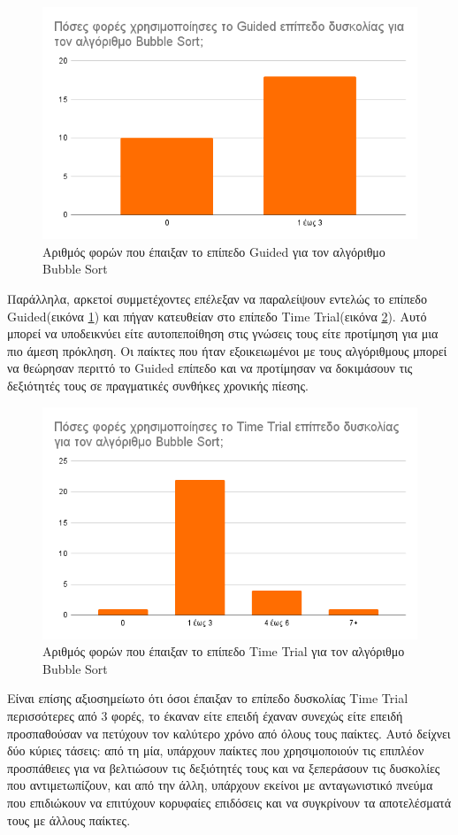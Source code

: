 \begin{figure}[H]
    \centering
    \includegraphics[width=0.7\linewidth]{sections/5/2/images/bubblesort_guided_usages}
    \caption{Αριθμός φορών που έπαιξαν το επίπεδο Guided για τον αλγόριθμο Bubble Sort}
    \label{fig:bubblesort_guided_usages}
\end{figure}

Παράλληλα, αρκετοί συμμετέχοντες επέλεξαν να παραλείψουν εντελώς το επίπεδο Guided(εικόνα \ref{fig:bubblesort_guided_usages}) και πήγαν κατευθείαν στο επίπεδο Time Trial(εικόνα \ref{fig:bubblesort_timetrial_usages}). Αυτό μπορεί να υποδεικνύει είτε αυτοπεποίθηση στις γνώσεις τους είτε προτίμηση για μια πιο άμεση πρόκληση. Οι παίκτες που ήταν εξοικειωμένοι με τους αλγόριθμους μπορεί να θεώρησαν περιττό το Guided επίπεδο και να προτίμησαν να δοκιμάσουν τις δεξιότητές τους σε πραγματικές συνθήκες χρονικής πίεσης.

\begin{figure}[H]
    \centering
    \includegraphics[width=0.7\linewidth]{sections/5/2/images/bubblesort_timetrial_usages}
    \caption{Αριθμός φορών που έπαιξαν το επίπεδο Time Trial για τον αλγόριθμο Bubble Sort}
    \label{fig:bubblesort_timetrial_usages}
\end{figure}

Είναι επίσης αξιοσημείωτο ότι όσοι έπαιξαν το επίπεδο δυσκολίας Time Trial περισσότερες από 3 φορές, το έκαναν είτε επειδή έχαναν συνεχώς είτε επειδή προσπαθούσαν να πετύχουν τον καλύτερο χρόνο από όλους τους παίκτες. Αυτό δείχνει δύο κύριες τάσεις: από τη μία, υπάρχουν παίκτες που χρησιμοποιούν τις επιπλέον προσπάθειες για να βελτιώσουν τις δεξιότητές τους και να ξεπεράσουν τις δυσκολίες που αντιμετωπίζουν, και από την άλλη, υπάρχουν εκείνοι με ανταγωνιστικό πνεύμα που επιδιώκουν να επιτύχουν κορυφαίες επιδόσεις και να συγκρίνουν τα αποτελέσματά τους με άλλους παίκτες.

